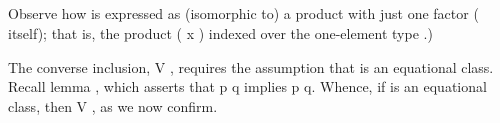 \begin{code}
\AgdaOperator{\AgdaFunction{𝔻[}}\AgdaSpace{}%
\AgdaSpace{}%
\AgdaOperator{\AgdaFunction{]}}\<%
\\
%
\>[2]\AgdaSpace{}%
\AgdaSymbol{=}\AgdaSpace{}%
\AgdaSpace{}%
\AgdaSymbol{\{}\AgdaSpace{}%
\AgdaSpace{}%
\AgdaSymbol{=}\AgdaSpace{}%
\AgdaSpace{}%
\AgdaSpace{}%
\AgdaSpace{}%
\AgdaSpace{}%
\AgdaSpace{}%
\AgdaSymbol{;}\AgdaSpace{}%
\AgdaSpace{}%
\AgdaSymbol{=}\AgdaSpace{}%
\AgdaSpace{}%
\AgdaSpace{}%
\AgdaSpace{}%
\AgdaSpace{}%
\AgdaSpace{}%
\AgdaSymbol{\}}\<%
\\
%
\>[2]\AgdaSpace{}%
\AgdaSymbol{:}\AgdaSpace{}%
\AgdaSpace{}%
\AgdaSpace{}%
\AgdaSpace{}%
\AgdaSpace{}%
\AgdaSpace{}%
\AgdaSpace{}%
\AgdaSymbol{)}\<%
\\
%
\>[2]\AgdaSpace{}%
\AgdaSymbol{=}\AgdaSpace{}%
\AgdaSpace{}%
\AgdaSymbol{(}\AgdaSpace{}%
\AgdaOperator{\AgdaInductiveConstructor{,}}\AgdaSpace{}%
\AgdaSpace{}%
\AgdaSymbol{)}\AgdaSpace{}%
\AgdaSymbol{(}\AgdaSpace{}%
\AgdaOperator{\AgdaInductiveConstructor{,}}\AgdaSpace{}%
\AgdaSpace{}%
\AgdaSymbol{)}\AgdaSpace{}%
\AgdaSpace{}%
\AgdaBound{\AgdaUnderscore{}}\AgdaSpace{}%
\AgdaBound{\AgdaUnderscore{}}\AgdaSpace{}%
\AgdaSpace{}%
\AgdaSymbol{)}\AgdaSpace{}%
\AgdaSpace{}%
\AgdaBound{\AgdaUnderscore{}}\AgdaSpace{}%
\AgdaSpace{}%
\AgdaSymbol{)}\<%
\\
\>[0]\<%
\end{code}
Observe how  is expressed as (isomorphic to) a product with just one factor ( itself); that is, the product
 ( \ab x  ) indexed over the one-element type .)

The converse inclusion, \af V   , requires the assumption
that  is an equational class. Recall lemma
, which asserts that   \ab p  \ab q implies 
    \ab p  \ab q. Whence, if  is an equational
class, then \af V   , as we now confirm.


